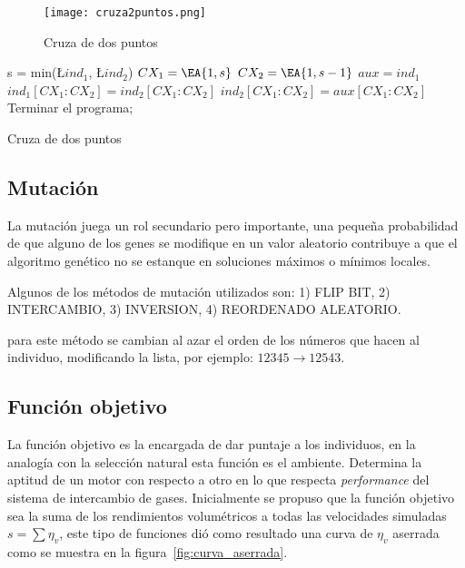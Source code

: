 \begin{figure}
  \centering
  \texttt{[image: cruza2puntos.png]}
  \caption{Cruza de dos puntos}\label{fig:cr2puntos}
\end{figure}


\begin{algorithm}[]
  \BlankLine
  s = min(\L{$ind_{1}$}, \L {$ind_{2}$})\;
  $CX_{1} = \EA{1, s}$\;
  $CX_{2} = \EA{1, s-1}$\;
  $aux = ind_{1}$\;
  $ind_{1}[CX_{1}:CX_{2}] = ind_{2}[CX_{1}:CX_{2}]$\;
  $ind_{2}[CX_{1}:CX_{2}] = aux[CX_{1}:CX_{2}]$\;
  \;
  Terminar el programa;
  \caption{Cruza de dos puntos}\label{algo:cr2puntos}
\end{algorithm}

\subsection{Mutación}
%
La mutación juega un rol secundario pero importante, una pequeña probabilidad
de que alguno de los genes se modifique en un valor aleatorio contribuye a que
el algoritmo genético no se estanque en soluciones máximos o mínimos locales.

Algunos de los métodos de mutación utilizados son: 1) FLIP BIT, 2) INTERCAMBIO,
3) INVERSION, 4) REORDENADO ALEATORIO.


para este método se cambian al azar el orden de los números que hacen al
individuo, modificando la lista, por ejemplo: $12345 \rightarrow 12543$.

\subsection{Función objetivo}\label{sec:funcion_objetivo}
%
La función objetivo es la encargada de dar puntaje a los individuos, en la
analogía con la selección natural esta función es el ambiente.
%
Determina la aptitud de un motor con respecto a otro en lo que respecta
\emph{performance} del sistema de intercambio de gases.
%
Inicialmente se propuso que la función objetivo sea la suma de los rendimientos
volumétricos a todas las velocidades simuladas $s=\sum \eta_{v}$, este tipo de
funciones dió como resultado una curva de $\eta_{v}$ aserrada como se muestra en
la figura~\ref{fig:curva_aserrada}.

